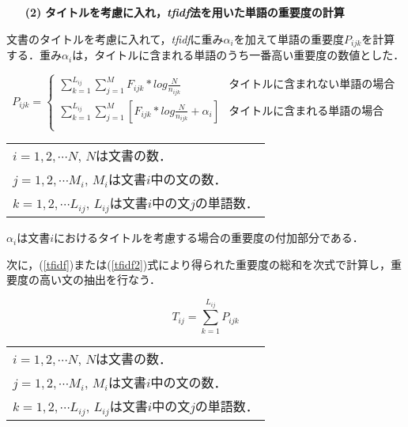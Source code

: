 \begin{itemize} 
\item[{\bf (2)}] {\bf タイトルを考慮に入れ，{\it tfidf}法を用いた単語の重要度の計算}
\end{itemize}

文書のタイトルを考慮に入れて，{\it tfidf}に重み$\alpha_{i}$を加えて単語の重要度$P_{ijk}$を計算する．重み$\alpha_{i}$は，タイトルに含まれる単語のうち一番高い重要度の数値とした．

\begin{equation}
\label{tfidf2}
P_{ijk} =	\left\{ \begin{array}{ll}
\sum_{k=1}^{L_{ij}} \sum_{j=1}^{M} F_{ijk}*log\frac{N}{n_{ijk}} & タイトルに含まれない単語の場合 \\
\sum_{k=1}^{L_{ij}} \sum_{j=1}^{M} [ F_{ijk}*log\frac{N}{n_{ijk}} +
\alpha_{i} ] & タイトルに含まれる単語の場合\\
\end{array}
\right .
\end{equation}

\begin{center}
\begin{tabular}{l}
$i = 1, 2, \cdots N$, \hspace*{1em}$N$は文書の数．\\

$j = 1, 2, \cdots M_{i}$, \hspace*{1em}$M_{i}$は文書$i$中の文の数．\\

$k = 1, 2, \cdots L_{ij}$, \hspace*{1em}$L_{ij}$は文書$i$中の文$j$の単語数．\\
\end{tabular}
\end{center}

$\alpha_{i}$は文書$i$におけるタイトルを考慮する場合の重要度の付加部分である．

次に，(\ref{tfidf})または(\ref{tfidf2})式により得られた重要度の総和を次式で計算し，重要度の高い文の抽出を行なう．


\begin{equation}
T_{ij} = \sum_{k=1}^{L_{ij}} P_{ijk} 
\end{equation}

\begin{center}
\begin{tabular}{l}
$i = 1, 2, \cdots N$, \hspace*{1em}$N$は文書の数．\\

$j = 1, 2, \cdots M_{i}$, \hspace*{1em}$M_{i}$は文書$i$中の文の数．\\

$k = 1, 2, \cdots L_{ij}$, \hspace*{1em}$L_{ij}$は文書$i$中の文$j$の単語数．\\
\end{tabular}
\end{center}

